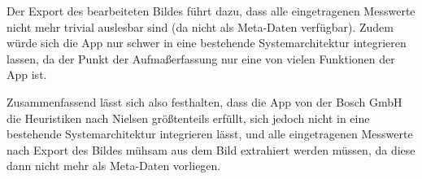 Der Export des bearbeiteten Bildes führt dazu, dass alle eingetragenen Messwerte nicht mehr trivial auslesbar sind (da nicht als Meta-Daten verfügbar). Zudem würde sich die App nur schwer in eine bestehende Systemarchitektur integrieren lassen, da der Punkt der Aufmaßerfassung nur eine von vielen Funktionen der App ist. 

Zusammenfassend lässt sich also festhalten, dass die App \mm{} von der Bosch GmbH die Heuristiken nach Nielsen größtenteils erfüllt, sich jedoch nicht in eine bestehende Systemarchitektur integrieren lässt, und alle eingetragenen Messwerte nach Export des Bildes mühsam aus dem Bild extrahiert werden müssen, da diese dann nicht mehr als Meta-Daten vorliegen.
